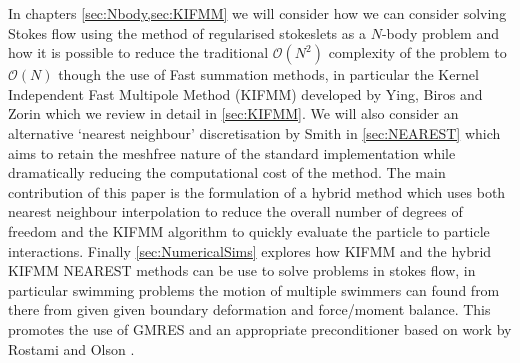 In chapters \cref{sec:Nbody,sec:KIFMM} we will consider how we can consider solving Stokes flow using the method of regularised stokeslets as a $N$-body problem and how it is possible to reduce the traditional $\mathcal{O}(N^2)$ complexity of the problem to $\mathcal{O}(N)$ though the use of Fast summation methods, in particular the Kernel Independent Fast Multipole Method (KIFMM) developed by Ying, Biros and Zorin \cite{Ying2004} which we review in detail in \cref{sec:KIFMM}. We will also consider an alternative `nearest neighbour' discretisation by Smith \cite{Smith2018AEquation} in \cref{sec:NEAREST} which aims to retain the meshfree nature  of the standard implementation while dramatically reducing the computational cost of the method. The main contribution of this paper is the formulation of a hybrid method which uses both nearest neighbour interpolation to reduce the overall number of degrees of freedom and the KIFMM algorithm to quickly evaluate the particle to particle interactions. Finally \cref{sec:NumericalSims} explores how KIFMM and the hybrid KIFMM NEAREST methods can be use to solve problems in stokes flow, in particular swimming problems the motion of multiple swimmers can found from there from given given boundary deformation and force/moment balance. This promotes the use of GMRES and an appropriate preconditioner based on work by Rostami and Olson \cite{Rostami2019FastBiofluids}.

